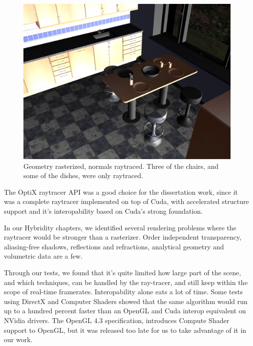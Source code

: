 \begin{figure}[H]
	\centering
	\includegraphics[width=1.00\textwidth]{Media/hybrid.png}
	\caption{Geometry rasterized, normals raytraced. Three of the chairs, and some of the dishes, were only raytraced.}
	\label{fig:hybrid_image01}
\end{figure}

The OptiX raytracer API was a good choice for the dissertation work, since it was a complete raytracer implemented on top of Cuda, with accelerated structure support and it's interopability based on Cuda's strong foundation.

In our Hybridity chapters, we identified several rendering problems where the raytracer would be stronger than a rasterizer. Order independent transparency, aliasing-free shadows, reflections and refractions, analytical geometry and volumetric data are a few.

Through our tests, we found that it's quite limited how large part of the scene, and which techniques, can be handled by the ray-tracer, and still keep within the scope of real-time framerates. Interopability alone eats a lot of time. Some tests using DirectX and Computer Shaders showed that the same algorithm would run up to a hundred percent faster than an OpenGL and Cuda interop equivalent on NVidia drivers. The OpenGL 4.3 specification, introduces Compute Shader support to OpenGL, but it was released too late for us to take advantage of it in our work.

